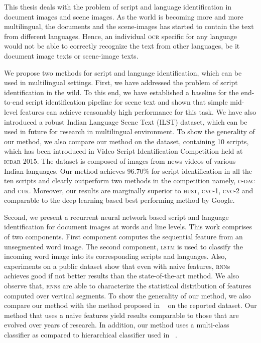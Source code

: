 This thesis deals with the problem of script and language identification in document images and scene images. As the world is becoming more and more multilingual, the documents and the scene-images has started to contain the text from different languages. Hence, an individual \textsc{ocr} specific for any language would not be able to correctly recognize the text from other languages, be it document image texts or scene-image texts.

We propose two methods for script and language identification, which can be used in multilingual settings. First, we have addressed the problem of script identification in the wild. To this end, we have established a baseline for the end-to-end script identification pipeline for scene text and shown that simple mid-level features can achieve reasonably high performance for this task. We have also introduced a robust Indian Language Scene Text (\textsc{ILST}) dataset, which can be used in future for research in multilingual environment. To show the generality of our method, we also compare our method on the dataset, containing 10 scripts, which has been introduced in Video Script Identification Competition held at \textsc{icdar} 2015. The dataset is composed of images from news videos of various Indian languages. Our method achieves 96.70\% for script identification in all the ten scripts and clearly outperform two methods in the competition namely, \textsc{c-dac} and \textsc{cuk}. Moreover, our results are marginally superior to \textsc{hust}, \textsc{cvc-1}, \textsc{cvc-2} and comparable to the deep learning based best performing method by Google.

Second, we present a recurrent neural network based script and language identification for document images at words and line levels. This work comprises of two components. First component computes the sequential feature from an unsegmented word image. The second component, \textsc{lstm} is used to classify the incoming word image into its corresponding  scripts and languages. Also, experiments on a public dataset show that even with naive features, \textsc{rnn}s achieves good if not better results than the state-of-the-art method. We also observe that, \textsc{rnn}s are able to characterize the statistical distribution of features computed over vertical segments. To show the generality of our method, we also compare our method with the method proposed in ~\cite{Pati} on the reported dataset. Our method that uses a naive features yield results comparable to those that are evolved over years of research. In addition, our method uses a multi-class classifier as compared to hierarchical classifier used in ~\cite{Pati}.

